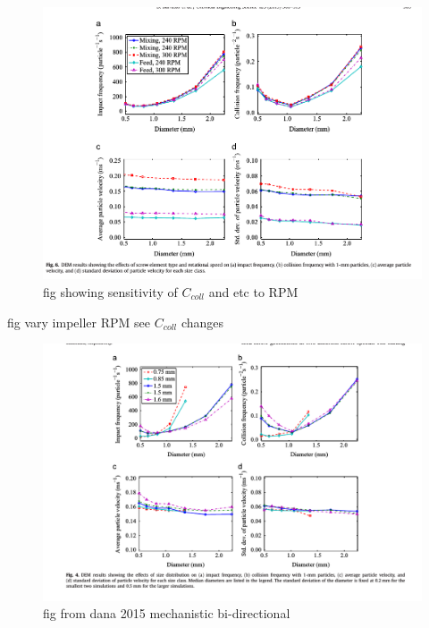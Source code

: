 \documentclass[preprint,11pt,authoryear]{elsarticle}
\begin{document}
      \begin{figure}[H]
      \centering
      \includegraphics[scale=0.5]{dana_quad_impact_coll_vs_RPM}
      \caption{ fig showing sensitivity of $C_{coll}$ and etc to RPM}
      \label{fig:rslts_psd_velocity}
      \end{figure} 
        
    \par fig vary impeller RPM see $C_{coll}$ changes
      \begin{figure}[H]
      \centering
      \includegraphics[scale=0.5]{rslts_dem_psd_velocity}
      \caption{ fig from dana 2015 mechanistic bi-directional}
      \label{fig:rslts_psd_velocity}
      \end{figure}
      
      
\end{document}
